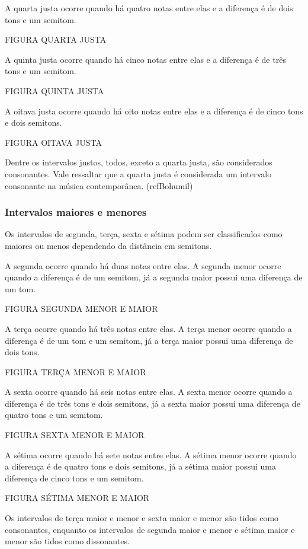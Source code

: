         A quarta justa ocorre quando há quatro notas entre elas e a diferença é de dois tons e um semitom.

        FIGURA QUARTA JUSTA

        A quinta justa ocorre quando há cinco notas entre elas e a diferença é de três tons e um semitom.

        FIGURA QUINTA JUSTA

        A oitava justa ocorre quando há oito notas entre elas e a diferença é de cinco tons e dois semitons.

        FIGURA OITAVA JUSTA

        Dentre os intervalos justos, todos, exceto a quarta justa, são considerados consonantes. Vale ressaltar que a quarta justa é considerada um intervalo consonante na música contemporânea. (refBohumil)

      \subsubsection[Intervalos Maiores e Menores]{Intervalos maiores e menores}

        Os intervalos de segunda, terça, sexta e sétima podem ser classificados como maiores ou menos dependendo da distância em semitons.

        A segunda ocorre quando há duas notas entre elas. A segunda menor ocorre quando a diferença é de um semitom, já a segunda maior possui uma diferença de um tom.

        FIGURA SEGUNDA MENOR E MAIOR


        A terça ocorre quando há três notas entre elas. A terça menor ocorre quando a diferença é de um tom e um semitom, já a terça maior possui uma diferença de dois tons.

        FIGURA TERÇA MENOR E MAIOR

        A sexta ocorre quando há seis notas entre elas. A sexta menor ocorre quando a diferença é de três tons e dois semitons, já a sexta maior possui uma diferença de quatro tons e um semitom.

        FIGURA SEXTA MENOR E MAIOR

        A sétima ocorre quando há sete notas entre elas. A sétima menor ocorre quando a diferença é de quatro tons e dois semitons, já a sétima maior possui uma diferença de cinco tons e um semitom.

        FIGURA SÉTIMA MENOR E MAIOR

        Os intervalos de terça maior e menor e sexta maior e menor são tidos como consonantes, enquanto os intervalos de segunda maior e menor e sétima maior e menor são tidos como dissonantes.

